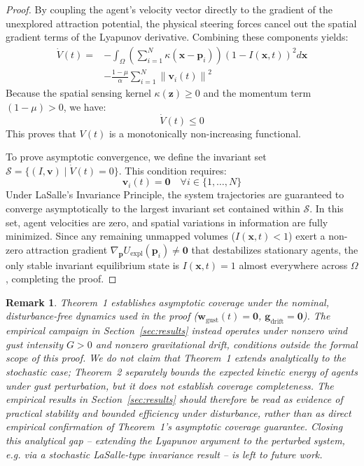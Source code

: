 \documentclass[letterpaper, 10pt, conference]{IEEEtran}
\newtheorem{remark}{Remark}
\newcommand{\norm}[1]{\left\lVert#1\right\rVert}
\begin{document}
\begin{proof}
By coupling the agent's velocity vector directly to the gradient of the unexplored attraction potential, the physical steering forces cancel out the spatial gradient terms of the Lyapunov derivative. Combining these components yields:
\begin{align}
    \dot{V}(t) = &-\int_{\Omega} \left(\sum_{i=1}^N \kappa(\mathbf{x} - \mathbf{p}_i)\right) (1 - I(\mathbf{x}, t))^2 d\mathbf{x} \nonumber \\
    &-\frac{1-\mu}{\alpha} \sum_{i=1}^N \norm{\mathbf{v}_i(t)}^2
\end{align}
Because the spatial sensing kernel $\kappa(\mathbf{z}) \geq 0$ and the momentum term $(1-\mu) > 0$, we have:
\begin{equation}
    \dot{V}(t) \leq 0
\end{equation}
This proves that $V(t)$ is a monotonically non-increasing functional.

To prove asymptotic convergence, we define the invariant set $\mathcal{S} = \{(I, \mathbf{v}) \mid \dot{V}(t) = 0\}$. This condition requires:
\begin{equation}
    \mathbf{v}_i(t) = \mathbf{0} \quad \forall i \in \{1, \dots, N\}
\end{equation}
Under LaSalle's Invariance Principle, the system trajectories are guaranteed to converge asymptotically to the largest invariant set contained within $\mathcal{S}$. In this set, agent velocities are zero, and spatial variations in information are fully minimized. Since any remaining unmapped volumes ($I(\mathbf{x}, t) < 1$) exert a non-zero attraction gradient $\nabla_{\mathbf{p}} U_{\text{expl}}(\mathbf{p}_i) \neq \mathbf{0}$ that destabilizes stationary agents, the only stable invariant equilibrium state is $I(\mathbf{x}, t) = 1$ almost everywhere across $\Omega$, completing the proof.
\end{proof}

\begin{remark}
Theorem~1 establishes asymptotic coverage under the nominal, disturbance-free dynamics used in the proof ($\mathbf{w}_{\text{gust}}(t) = \mathbf{0}$, $\mathbf{g}_{\text{drift}} = \mathbf{0}$). The empirical campaign in Section~\ref{sec:results} instead operates under nonzero wind gust intensity $G > 0$ and nonzero gravitational drift, conditions outside the formal scope of this proof. We do not claim that Theorem~1 extends analytically to the stochastic case; Theorem~2 separately bounds the expected kinetic energy of agents under gust perturbation, but it does not establish coverage completeness. The empirical results in Section~\ref{sec:results} should therefore be read as evidence of practical stability and bounded efficiency under disturbance, rather than as direct empirical confirmation of Theorem~1's asymptotic coverage guarantee. Closing this analytical gap -- extending the Lyapunov argument to the perturbed system, e.g. via a stochastic LaSalle-type invariance result -- is left to future work.
\end{remark}
\end{document}
